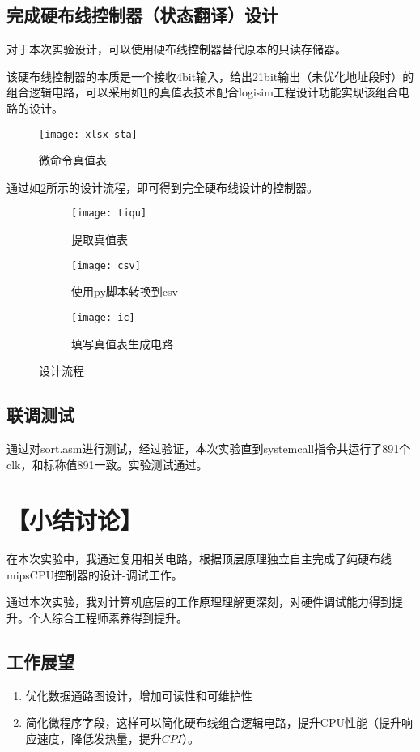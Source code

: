 \documentclass[withoutpreface]{cumcmthesis}
\begin{document}
\subsection{完成硬布线控制器（状态翻译）设计}
对于本次实验设计，可以使用硬布线控制器替代原本的只读存储器。

该硬布线控制器的本质是一个接收4bit输入，给出21bit输出（未优化地址段时）的组合逻辑电路，可以采用如\cref{fig:xlsx-true}的真值表技术配合logisim工程设计功能实现该组合电路的设计。

\begin{figure}[!h]
	\centering
	\texttt{[image: xlsx-sta]}
	\caption{微命令真值表}\label{fig:xlsx-true}
\end{figure}

通过如\cref{fig:design}所示的设计流程，即可得到完全硬布线设计的控制器。

\begin{figure}[!h]
	\centering
	\begin{subfigure}[b]{0.3\textwidth}
		\centering
		\texttt{[image: tiqu]}
		\caption{提取真值表}
	\end{subfigure}
	\hfill
	\begin{subfigure}[b]{0.3\textwidth}
		\centering
		\texttt{[image: csv]}
		\caption{使用py脚本转换到csv}
	\end{subfigure}
	\hfill
	\begin{subfigure}[b]{0.3\textwidth}
		\centering
		\texttt{[image: ic]}
		\caption{填写真值表生成电路}
	\end{subfigure}
	\caption{设计流程}\label{fig:design}
\end{figure}

\newpage
\subsection{联调测试}

通过对sort.asm进行测试，经过验证，本次实验直到systemcall指令共运行了891个clk，和标称值891一致。实验测试通过。
\section{【小结讨论】}
在本次实验中，我通过复用相关电路，根据顶层原理独立自主完成了纯硬布线mipsCPU控制器的设计-调试工作。

通过本次实验，我对计算机底层的工作原理理解更深刻，对硬件调试能力得到提升。个人综合工程师素养得到提升。
\subsection{工作展望}
\begin{enumerate}
	\item 优化数据通路图设计，增加可读性和可维护性
	\item 简化微程序字段，这样可以简化硬布线组合逻辑电路，提升CPU性能（提升响应速度，降低发热量，提升$CPI$）。
\end{enumerate}
\end{document}
